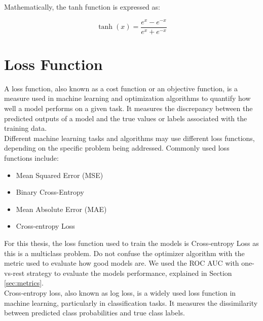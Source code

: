 \begin{itemize}
    \centering

    \raggedright
    Mathematically, the tanh function is expressed as:

    \[ \tanh(x) = \frac{{e^x - e^{-x}}}{{e^x + e^{-x}}} \]

\end{itemize}

\section{Loss Function}

A loss function, also known as a cost function or an objective function, is a
measure used in machine learning and optimization algorithms to quantify how
well a model performs on a given task. It measures the discrepancy between
the predicted outputs of a model and the true values or labels associated with
the training data. \\

Different machine learning tasks and algorithms may use different loss
functions, depending on the specific problem being addressed. Commonly used
loss functions include:

\begin{itemize}
  \item Mean Squared Error (MSE)
  \item Binary Cross-Entropy
  \item Mean Absolute Error (MAE)
  \item Cross-entropy Loss
\end{itemize}

For this thesis, the loss function used to train the models is
Cross-entropy Loss as this is a multiclass problem. Do not confuse the
optimizer algorithm with the metric used to evaluate how good models are. We
used the ROC AUC with one-vs-rest strategy to evaluate the models performance,
explained in Section \ref{sec:metrics}. \\

Cross-entropy loss, also known as log loss, is a widely used loss function in
machine learning, particularly in classification tasks. It measures the
dissimilarity between predicted class probabilities and true class labels.
\\

